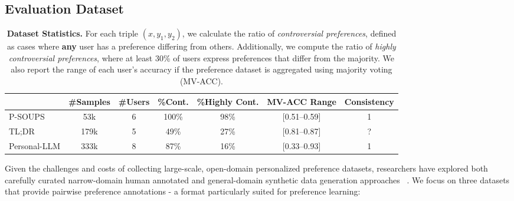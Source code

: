 \subsection{Evaluation Dataset} 
\begin{table*}[h!]
\small
\centering
\begin{tabular}{l c c c c c c}

\toprule
          & \#Samples & \#Users & \%Cont.  & \%Highly Cont.  &  MV-ACC Range  & Consistency \\ \midrule \midrule
P-SOUPS     &    53k       &      6    &   100\% &   98\%    &   [0.51--0.59]   &    1 \\ \midrule
TL;DR     &    179k        &     5    &   49\%  &   27\%   &   [0.81--0.87]  &   ? \\    \midrule
Personal-LLM &     333k       &     8    &   87\%  &   16\%   &   [0.33--0.93]  &   1 \\ \bottomrule
\end{tabular}
\caption{\textbf{Dataset Statistics.} For each triple \((x, y_1, y_2)\), we calculate the ratio of \textit{controversial preferences}, defined as cases where \textbf{any} user has a preference differing from others. Additionally, we compute the ratio of \textit{highly controversial preferences}, where at least 30\% of users express preferences that differ from the majority. We also report the range of each user's accuracy if the preference dataset is aggregated using majority voting (MV-ACC).} 
\label{dataset}
\vspace{-0.5cm}
\end{table*}



Given the challenges and costs of collecting large-scale, open-domain personalized preference datasets, researchers have explored both carefully curated narrow-domain human annotated and general-domain synthetic data generation approaches ~\cite{stiennon_learning_2022,jang_personalized_2023,zollo_personalllm_2024,castricato_persona_2024}. We focus on three datasets that provide pairwise preference annotations - a format particularly suited for preference learning:

